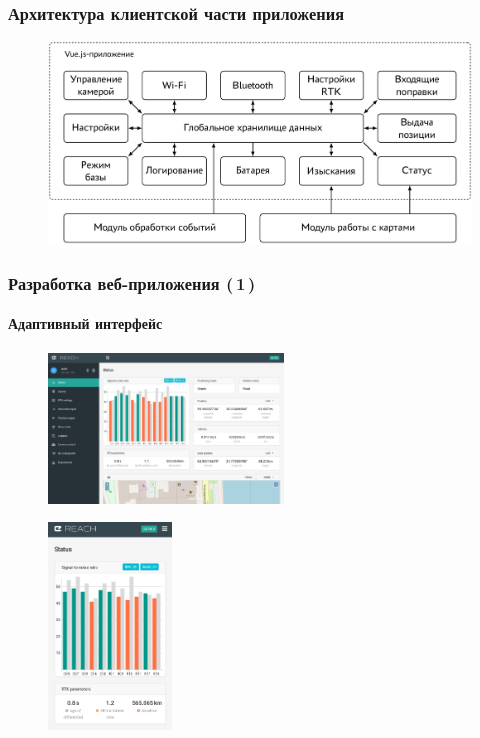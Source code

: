 \documentclass[xetex,с,aspectratio=169]{beamer}
\begin{document}
%
%
\begin{frame}
  \frametitle{Архитектура клиентской части приложения}
  \vskip -0.25cm
  \begin{figure}[h]
    \centering
    \includegraphics[width=.9\textwidth]{../img/tikz/fe-architecture/pic}
  \end{figure}
\end{frame}


%
%
\begin{frame}
  \frametitle{Разработка веб-приложения (\,1\,)}
  \framesubtitle{Адаптивный интерфейс}

  \begin{minipage}{\textwidth}
    \centering
    \begin{minipage}[c]{.5\textwidth}
      \centering
      \begin{figure}[c]
        \centering
        \includegraphics[height=4cm]{../img/reachview/homepage_responsive-lg}
      \end{figure}
    \end{minipage}
    \hspace{2em}
    \begin{minipage}[c]{.3\textwidth}
      \centering
      \begin{figure}[c]
        \centering
        \includegraphics[height=5.5cm]{../img/reachview/homepage_responsive-xs}
      \end{figure}
    \end{minipage}
  \end{minipage}
\end{frame}
\end{document}
